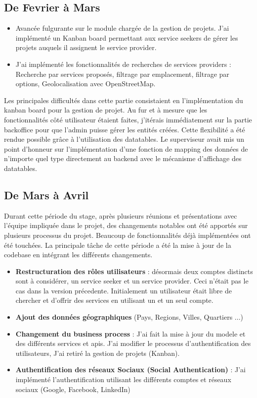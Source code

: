 \subsection*{De Fevrier à Mars}

\begin{itemize} 
    \item Avancée fulgurante sur le module chargée de la gestion de projets. J'ai implémenté un Kanban board permettant aux service seekers de gérer les projets auquels il assignent le service provider.
    \item J'ai implémenté les fonctionnalités de recherches de services providers : Recherche par services proposés, filtrage par emplacement, filtrage par options, Geolocalisation avec OpenStreetMap.
\end{itemize}

\vspace{1cm}
Les principales difficultés dans cette partie consistaient en l'implémentation du kanban board pour la gestion de projet. Au fur et à mesure que les fonctionnalités côté utilisateur étaient faites, j'itérais immédiatement sur la partie backoffice pour que l'admin puisse gérer les entités créées. Cette flexibilité a été rendue possible grâce à l'utilisation des datatables. Le superviseur avait mis un point d'honneur sur l'implémentation d'une fonction de mapping des données de n'importe quel type directement au backend avec le mécanisme d'affichage des datatables.

\subsection*{De Mars à Avril}

Durant cette période du stage, après plusieurs réunions et présentations avec l'équipe impliquée dans le projet, des changements notables ont été apportés sur plusieurs processus du projet. Beaucoup de fonctionnalités déjà implémentées ont été touchées. La principale tâche de cette période a été la mise à jour de la codebase en intégrant les différents changements. \\

\begin{itemize}
    \item \textbf{Restructuration des rôles utilisateurs} : désormais deux comptes distincts sont à considérer, un service seeker et un service provider. Ceci n'était pas le cas dans la version précedente. Initialement un utilisateur était libre de chercher et d'offrir des services en utilisant un et un seul compte.
    \item \textbf{Ajout des données géographiques} (Pays, Regions, Villes, Quartiers ...)
    \item \textbf{Changement du business process} : 
    J'ai fait la mise à jour du modele et des différents services et apis. J'ai modifier le processus d'authentification des utilisateurs, J'ai retiré la gestion de projets (Kanban).
    \item \textbf{Authentification des réseaux Sociaux (Social Authentication)} : J'ai implémenté l'authentification utilisant les différents comptes et réseaux sociaux (Google, Facebook, LinkedIn)
\end{itemize}

